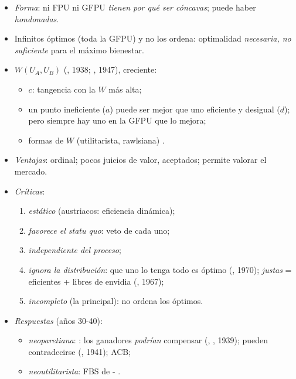\documentclass{article}
\begin{document}
\begin{columnas}
\begin{itemize}
\item \emph{Forma}: ni FPU ni GFPU \emph{tienen por qué ser cóncavas}; puede haber \emph{hondonadas}.
\end{itemize}
\begin{itemize}
\item Infinitos óptimos (toda la GFPU) y  no los ordena: optimalidad \emph{necesaria, no suficiente} para el máximo bienestar.
\item {} $W(U_A,U_B)$ (, 1938; , 1947), creciente:
  \begin{itemize}
  \item {} $c$: tangencia con la $W$ más alta;
  \item un punto ineficiente ($a$) puede ser mejor que uno eficiente y desigual ($d$); pero siempre hay uno en la GFPU que lo mejora;
  \item formas de $W$ (utilitarista, rawlsiana) .
  \end{itemize}
\end{itemize}

\begin{itemize}
\item \emph{Ventajas}: ordinal; pocos juicios de valor, aceptados; permite valorar el mercado.
\item \emph{Críticas}:
  \begin{enumerate}
  \item \emph{estático} (austriacos: eficiencia dinámica);
  \item \emph{favorece el statu quo}: veto de cada uno;
  \item \emph{independiente del proceso};
  \item \emph{ignora la distribución}: que uno lo tenga todo es óptimo (, 1970); \emph{justas} = eficientes + libres de envidia (, 1967);
  \item \emph{incompleto} (la principal): no ordena los óptimos.
  \end{enumerate}
\item \emph{Respuestas} (años 30-40):
  \begin{itemize}
  \item \emph{neoparetiana}: : los ganadores \emph{podrían} compensar (, , 1939); pueden contradecirse (, 1941); ACB;
  \item \emph{neoutilitarista}: FBS de - .
  \end{itemize}
\end{itemize}


\end{columnas}
\end{document}
